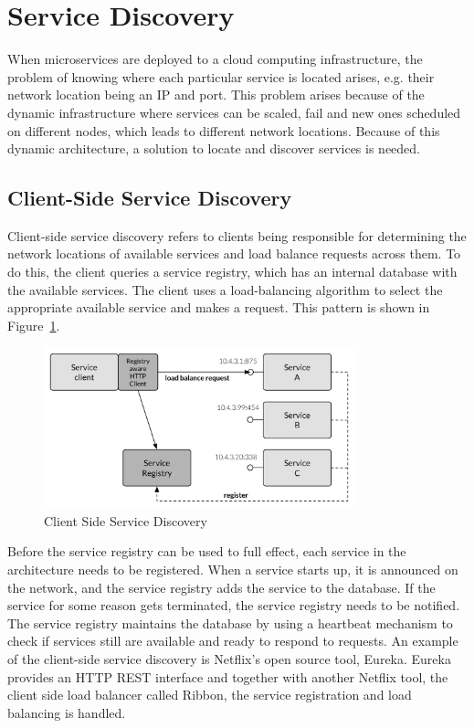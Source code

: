 
\section{Service Discovery}
When microservices are deployed to a cloud computing infrastructure, the problem of knowing where each particular service is located arises, e.g. their network location being an IP and port. This problem arises because of the dynamic infrastructure where services can be scaled, fail and new ones scheduled on different nodes, which leads to different network locations. Because of this dynamic architecture, a solution to locate and discover services is needed. 

\subsection*{Client-Side Service Discovery}
Client-side service discovery refers to clients being responsible for determining the network locations of available services and load balance requests across them. To do this, the client queries a service registry, which has an internal database with the available services. The client uses a load-balancing algorithm to select the appropriate available service and makes a request. This pattern is shown in Figure~\ref{fig:client_side_service_discovery}.

\begin{figure}[H]
    \centering
    \includegraphics[width=9cm]{figures/client_side_service_discovery}
    \caption{Client Side Service Discovery \cite{servicediscovery}}
    \label{fig:client_side_service_discovery}
\end{figure}

\noindent 
Before the service registry can be used to full effect, each service in the architecture needs to be registered. When a service starts up, it is announced on the network, and the service registry adds the service to the database. If the service for some reason gets terminated, the service registry needs to be notified. The service registry maintains the database by using a heartbeat mechanism to check if services still are available and ready to respond to requests. An example of the client-side service discovery is Netflix's open source tool, Eureka. Eureka provides an HTTP REST interface and together with another Netflix tool, the client side load balancer called Ribbon, the service registration and load balancing is handled.

